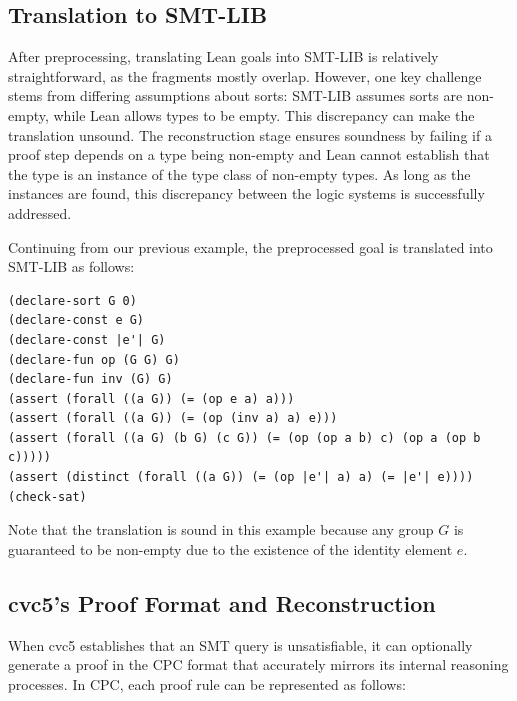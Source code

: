 \documentclass[runningheads]{llncs}
\begin{document}
\subsection{Translation to SMT-LIB}
\label{sec:translation}

After preprocessing, translating Lean goals into SMT-LIB is relatively straightforward, as the fragments mostly overlap. However, one key challenge stems from differing assumptions about sorts: SMT-LIB assumes sorts are non-empty, while Lean allows types to be empty.
%
This discrepancy can make the translation unsound.
%
The reconstruction stage ensures
soundness by failing if a proof step depends on a type being non-empty and Lean
cannot establish that the type is an instance of the type class of non-empty
types.
%
As long as the instances are found, this discrepancy between the logic systems
is successfully addressed.


\begin{example}
Continuing from our previous example, the preprocessed goal is translated into SMT-LIB as follows:
\begin{lstlisting}[language=LISP]
(declare-sort G 0)
(declare-const e G)
(declare-const |e'| G)
(declare-fun op (G G) G)
(declare-fun inv (G) G)
(assert (forall ((a G)) (= (op e a) a)))
(assert (forall ((a G)) (= (op (inv a) a) e)))
(assert (forall ((a G) (b G) (c G)) (= (op (op a b) c) (op a (op b c)))))
(assert (distinct (forall ((a G)) (= (op |e'| a) a) (= |e'| e))))
(check-sat)
\end{lstlisting}
Note that the translation is sound in this example because any group \( G \) is guaranteed to be non-empty due to the existence of the identity element \( e \).
\end{example}

\subsection{cvc5's Proof Format and Reconstruction}
\label{sec:proofRec}

When cvc5 establishes that an SMT query is unsatisfiable, it can optionally
generate a proof in the CPC format that accurately mirrors its internal
reasoning processes.
%
In CPC, each proof rule can be represented as follows:
\end{document}
